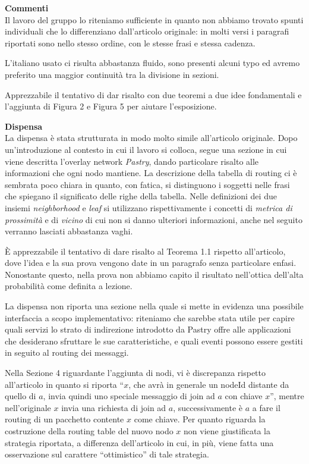 \documentclass[11pt]{article}
\begin{document}
\theform
\begin{formalreport}
  \textbf{Commenti}\\
  Il lavoro del gruppo lo riteniamo sufficiente in quanto non abbiamo
  trovato spunti individuali che lo differenziano dall'articolo
  originale: in molti versi i paragrafi riportati sono nello stesso
  ordine, con le stesse frasi e stessa cadenza. 

  L'italiano usato ci risulta abbastanza fluido, sono presenti alcuni
  typo ed avremo preferito una maggior continuit\`a tra la divisione
  in sezioni.

  Apprezzabile il tentativo di dar risalto con due teoremi a due idee
  fondamentali e l'aggiunta di Figura 2 e Figura 5 per aiutare
  l'esposizione.

  \textbf{Dispensa}\\
  La dispensa \`e stata strutturata in modo molto simile all'articolo
  originale. Dopo un'introduzione al contesto in cui il lavoro si
  colloca, segue una sezione in cui viene descritta l'overlay network
  \emph{Pastry}, dando particolare risalto alle informazioni che ogni
  nodo mantiene. La descrizione della tabella di routing ci \`e
  sembrata poco chiara in quanto, con fatica, si distinguono i
  soggetti nelle frasi che spiegano il significato delle righe della
  tabella. Nelle definizioni dei due insiemi \emph{neighborhood} e
  \emph{leaf} si utilizzano rispettivamente i concetti di
  \emph{metrica di prossimit\`a} e di \emph{vicino} di cui non si
  danno ulteriori informazioni, anche nel seguito verranno lasciati
  abbastanza vaghi.

  \`E apprezzabile il tentativo di dare risalto al Teorema 1.1
  rispetto all'articolo, dove l'idea e la sua prova vengono date in un
  paragrafo senza particolare enfasi. Nonostante questo, nella prova
  non abbiamo capito il risultato nell'ottica dell'alta probabilit\`a
  come definita a lezione.

  La dispensa non riporta una sezione nella quale si mette in evidenza
  una possibile interfaccia a scopo implementativo: riteniamo che
  sarebbe stata utile per capire quali servizi lo strato di
  indirezione introdotto da Pastry offre alle applicazioni che
  desiderano sfruttare le sue caratteristiche, e quali eventi possono
  essere gestiti in seguito al routing dei messaggi.

  Nella Sezione 4 riguardante l'aggiunta di nodi, vi \`e discrepanza
  rispetto all'articolo in quanto si riporta ``$x$, che avr\`a in
  generale un nodeId distante da quello di $a$, invia quindi uno
  speciale messaggio di join ad $a$ con chiave $x$'', mentre
  nell'originale $x$ invia una richiesta di join ad $a$,
  successivamente \`e $a$ a fare il routing di un pacchetto contente
  $x$ come chiave. Per quanto riguarda la costruzione della routing
  table del nuovo nodo $x$ non viene giustificata la strategia
  riportata, a differenza dell'articolo in cui, in pi\`u, viene fatta
  una osservazione sul carattere ``ottimistico'' di tale strategia.


\end{formalreport}
\end{document}
